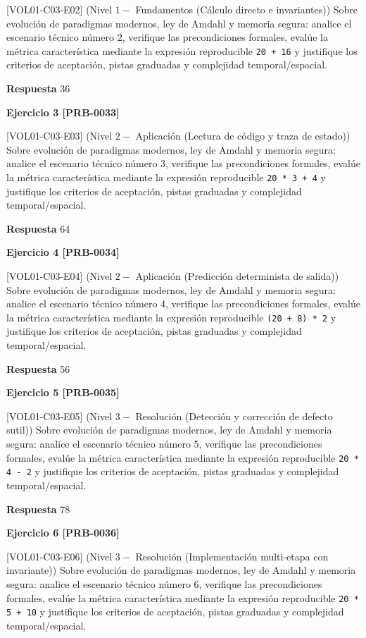 \documentclass{book}
\begin{document}
[VOL01-C03-E02] (Nivel \(1 -\) Fundamentos (Cálculo directo e invariantes)) Sobre evolución de paradigmas modernos, ley de Amdahl y memoria segura: analice el escenario técnico número 2, verifique las precondiciones formales, evalúe la métrica característica mediante la expresión reproducible \texttt{20 + 16} y justifique los criterios de aceptación, pistas graduadas y complejidad temporal/espacial.

\noindent\textbf{Respuesta} 36

\noindent\textbf{Ejercicio 3 [PRB-0033]}

[VOL01-C03-E03] (Nivel \(2 -\) Aplicación (Lectura de código y traza de estado)) Sobre evolución de paradigmas modernos, ley de Amdahl y memoria segura: analice el escenario técnico número 3, verifique las precondiciones formales, evalúe la métrica característica mediante la expresión reproducible \texttt{20 * 3 + 4} y justifique los criterios de aceptación, pistas graduadas y complejidad temporal/espacial.

\noindent\textbf{Respuesta} 64

\noindent\textbf{Ejercicio 4 [PRB-0034]}

[VOL01-C03-E04] (Nivel \(2 -\) Aplicación (Predicción determinista de salida)) Sobre evolución de paradigmas modernos, ley de Amdahl y memoria segura: analice el escenario técnico número 4, verifique las precondiciones formales, evalúe la métrica característica mediante la expresión reproducible \texttt{(20 + 8) * 2} y justifique los criterios de aceptación, pistas graduadas y complejidad temporal/espacial.

\noindent\textbf{Respuesta} 56

\noindent\textbf{Ejercicio 5 [PRB-0035]}

[VOL01-C03-E05] (Nivel \(3 -\) Resolución (Detección y corrección de defecto sutil)) Sobre evolución de paradigmas modernos, ley de Amdahl y memoria segura: analice el escenario técnico número 5, verifique las precondiciones formales, evalúe la métrica característica mediante la expresión reproducible \texttt{20 * 4 - 2} y justifique los criterios de aceptación, pistas graduadas y complejidad temporal/espacial.

\noindent\textbf{Respuesta} 78

\noindent\textbf{Ejercicio 6 [PRB-0036]}

[VOL01-C03-E06] (Nivel \(3 -\) Resolución (Implementación multi-etapa con invariante)) Sobre evolución de paradigmas modernos, ley de Amdahl y memoria segura: analice el escenario técnico número 6, verifique las precondiciones formales, evalúe la métrica característica mediante la expresión reproducible \texttt{20 * 5 + 10} y justifique los criterios de aceptación, pistas graduadas y complejidad temporal/espacial.
\end{document}
